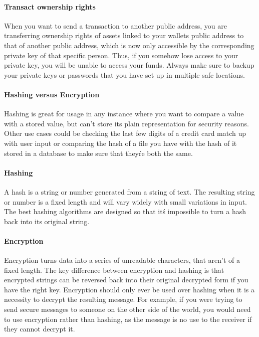 \paragraph{Transact ownership rights}
When you want to send a transaction to another public address, you are transferring ownership rights of assets linked to your wallets public address to that of another public address, which is now only accessible by the corresponding private key of that specific person. Thus, if you somehow lose access to your private key, you will be unable to access your funds. Always make sure to backup your private keys or passwords that you have set up in multiple safe locations.
 
\paragraph{Hashing versus Encryption}
Hashing is great for usage in any instance where you want to compare a value with a stored value, but can't store its plain representation for security reasons. Other use cases could be checking the last few digits of a credit card match up with user input or comparing the hash of a file you have with the hash of it stored in a database to make sure that they\'re both the same.
 
\paragraph{Hashing}
A hash is a string or number generated from a string of text. The resulting string or number is a fixed length and will vary widely with small variations in input. The best hashing algorithms are designed so that it\'s impossible to turn a hash back into its original string.

\paragraph{Encryption}
Encryption turns data into a series of unreadable characters, that aren't of a fixed length. The key difference between encryption and hashing is that encrypted strings can be reversed back into their original decrypted form if you have the right key. Encryption should only ever be used over hashing when it is a necessity to decrypt the resulting message. For example, if you were trying to send secure messages to someone on the other side of the world, you would need to use encryption rather than hashing, as the message is no use to the receiver if they cannot decrypt it. 

